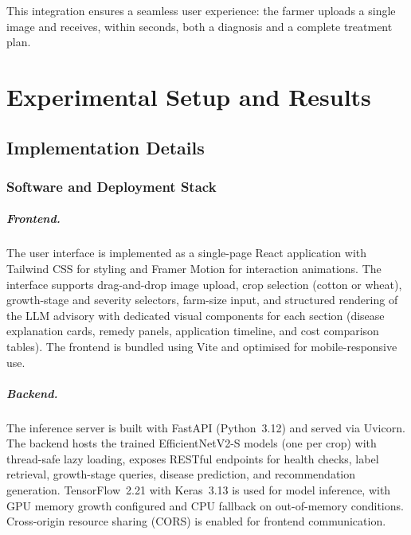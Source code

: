 \documentclass[12pt,a4paper]{report}
\begin{document}
This integration ensures a seamless user experience: the farmer uploads a single image and receives, within seconds, both a diagnosis and a complete treatment plan.

\chapter{Experimental Setup and Results}

\section{Implementation Details}

\subsection{Software and Deployment Stack}

\paragraph{Frontend.}
The user interface is implemented as a single-page React application with Tailwind CSS for styling and Framer Motion for interaction animations. The interface supports drag-and-drop image upload, crop selection (cotton or wheat), growth-stage and severity selectors, farm-size input, and structured rendering of the LLM advisory with dedicated visual components for each section (disease explanation cards, remedy panels, application timeline, and cost comparison tables). The frontend is bundled using Vite and optimised for mobile-responsive use.

\paragraph{Backend.}
The inference server is built with FastAPI (Python~3.12) and served via Uvicorn. The backend hosts the trained EfficientNetV2-S models (one per crop) with thread-safe lazy loading, exposes RESTful endpoints for health checks, label retrieval, growth-stage queries, disease prediction, and recommendation generation. TensorFlow~2.21 with Keras~3.13 is used for model inference, with GPU memory growth configured and CPU fallback on out-of-memory conditions. Cross-origin resource sharing (CORS) is enabled for frontend communication.
\end{document}
